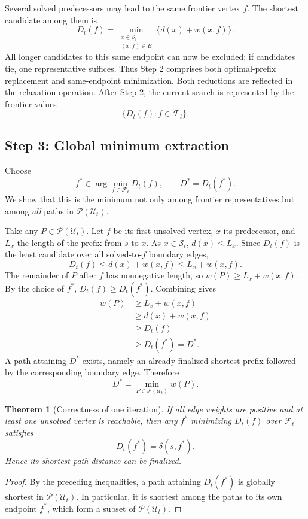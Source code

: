 \documentclass[11pt]{article}
\newtheorem{theorem}{Theorem}
\newcommand{\Sset}{\mathcal{S}_t}
\newcommand{\Fset}{\mathcal{F}_t}
\newcommand{\PathU}{\mathcal{P}(\mathcal{U}_t)}
\begin{document}
Several solved predecessors may lead to the same frontier vertex $f$. The shortest candidate among them is
\[
  D_t(f)=
  \min_{\substack{x\in\Sset\\(x,f)\in E}}
  \{d(x)+w(x,f)\}.
\]
All longer candidates to this same endpoint can now be excluded; if candidates tie, one representative suffices. Thus Step 2 comprises both optimal-prefix replacement and same-endpoint minimization. Both reductions are reflected in the relaxation operation. After Step 2, the current search is represented by the frontier values
\[
  \{D_t(f):f\in\Fset\}.
\]

\subsection{Step 3: Global minimum extraction}
Choose
\[
 f^*\in\arg\min_{f\in\Fset}D_t(f),
 \qquad D^*=D_t(f^*).
\]
We show that this is the minimum not only among frontier representatives but among \emph{all} paths in $\PathU$.

Take any $P\in\PathU$. Let $f$ be its first unsolved vertex, $x$ its predecessor, and $L_x$ the length of the prefix from $s$ to $x$. As $x\in\Sset$, $d(x)\le L_x$. Since $D_t(f)$ is the least candidate over all solved-to-$f$ boundary edges,
\[
 D_t(f)\le d(x)+w(x,f)\le L_x+w(x,f).
\]
The remainder of $P$ after $f$ has nonnegative length, so $w(P)\ge L_x+w(x,f)$. By the choice of $f^*$, $D_t(f)\ge D_t(f^*)$. Combining gives
\[
 \begin{aligned}
 w(P)&\ge L_x+w(x,f)\\
     &\ge d(x)+w(x,f)\\
     &\ge D_t(f)\\
     &\ge D_t(f^*)=D^*.
 \end{aligned}
\]
A path attaining $D^*$ exists, namely an already finalized shortest prefix followed by the corresponding boundary edge. Therefore
\[
  D^*=\min_{P\in\PathU} w(P).
\]

\begin{theorem}[Correctness of one iteration]\label{thm:iteration}
If all edge weights are positive and at least one unsolved vertex is reachable, then any $f^*$ minimizing $D_t(f)$ over $\Fset$ satisfies
\[
  D_t(f^*)=\delta(s,f^*).
\]
Hence its shortest-path distance can be finalized.
\end{theorem}
\begin{proof}
By the preceding inequalities, a path attaining $D_t(f^*)$ is globally shortest in $\PathU$. In particular, it is shortest among the paths to its own endpoint $f^*$, which form a subset of $\PathU$.
\end{proof}
\end{document}
